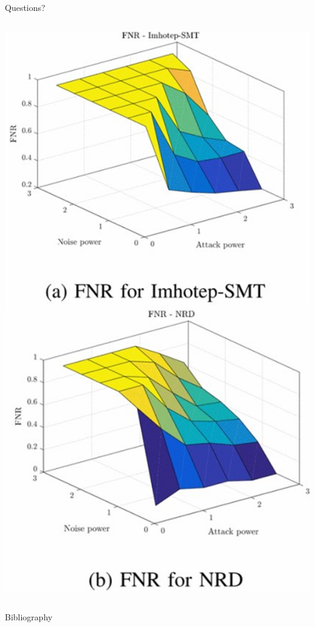 \documentclass[aspectratio=169]{beamer}
\begin{document}
\begin{frame}{Questions?}
\begin{columns}
\begin{column}{0.25\textwidth}
			\includegraphics[width=\columnwidth]{Images/Sim_FNR_SMPvsNRD5}
		\end{column}
	\end{columns}
\end{frame}



\begin{frame}[allowframebreaks]{Bibliography}
	
	
\end{frame}
\end{document}
